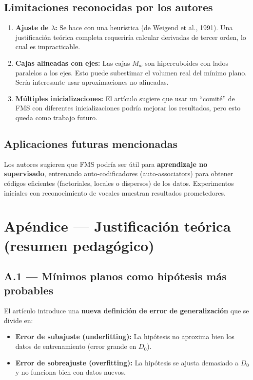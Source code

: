 \documentclass[11pt,a4paper]{article}
\begin{document}
\subsection{Limitaciones reconocidas por los autores}

\begin{enumerate}
    \item \textbf{Ajuste de $\lambda$:} Se hace con una heurística (de Weigend et al., 1991). Una justificación teórica completa requeriría calcular derivadas de tercer orden, lo cual es impracticable.
    \item \textbf{Cajas alineadas con ejes:} Las cajas $M_w$ son hipercuboides con lados paralelos a los ejes. Esto puede subestimar el volumen real del mínimo plano. Sería interesante usar aproximaciones no alineadas.
    \item \textbf{Múltiples inicializaciones:} El artículo sugiere que usar un ``comité'' de FMS con diferentes inicializaciones podría mejorar los resultados, pero esto queda como trabajo futuro.
\end{enumerate}

\subsection{Aplicaciones futuras mencionadas}

Los autores sugieren que FMS podría ser útil para \textbf{aprendizaje no supervisado}, entrenando auto-codificadores (auto-associators) para obtener códigos eficientes (factoriales, locales o dispersos) de los datos. Experimentos iniciales con reconocimiento de vocales muestran resultados prometedores.

\section{Apéndice — Justificación teórica (resumen pedagógico)}
\label{sec:apendice}

\subsection{A.1 — Mínimos planos como hipótesis más probables}

El artículo introduce una \textbf{nueva definición de error de generalización} que se divide en:

\begin{itemize}
    \item \textbf{Error de subajuste (underfitting):} La hipótesis no aproxima bien los datos de entrenamiento (error grande en $D_0$).
    \item \textbf{Error de sobreajuste (overfitting):} La hipótesis se ajusta demasiado a $D_0$ y no funciona bien con datos nuevos.
\end{itemize}
\end{document}
